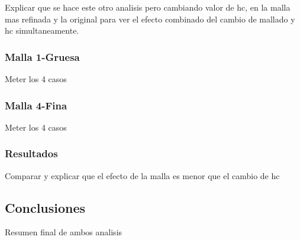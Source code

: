 Explicar que se hace este otro analisis pero cambiando valor de hc, en la malla mas refinada y la original para ver el efecto combinado del cambio de mallado y hc simultaneamente.

\subsubsection{Malla 1-Gruesa}

Meter los 4 casos

\subsubsection{Malla 4-Fina}

Meter los 4 casos

\subsubsection{Resultados}

Comparar y explicar que el efecto de la malla es menor que el cambio de hc

\subsection{Conclusiones}

Resumen final de ambos analisis

